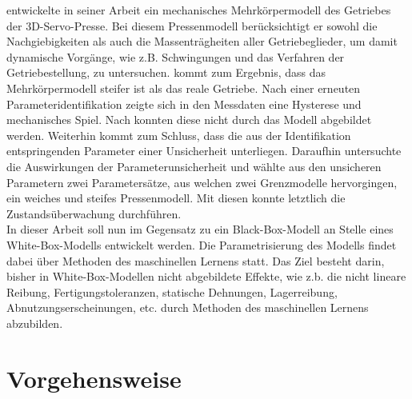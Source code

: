 \cite{Rakowitsch.2018} entwickelte in seiner Arbeit ein mechanisches Mehrkörpermodell des Getriebes der 3D-Servo-Presse. Bei diesem Pressenmodell berücksichtigt er sowohl die Nachgiebigkeiten als auch die Massenträgheiten aller Getriebeglieder, um damit dynamische Vorgänge, wie z.B. Schwingungen und das Verfahren der Getriebestellung, zu untersuchen. \cite{Rakowitsch.2018} kommt zum Ergebnis, dass das Mehrkörpermodell steifer ist als das reale Getriebe. Nach einer erneuten Parameteridentifikation zeigte sich in den Messdaten eine Hysterese und mechanisches Spiel. Nach \cite{Rakowitsch.2018} konnten diese nicht durch das Modell abgebildet werden. Weiterhin kommt \cite{Rakowitsch.2018} zum Schluss, dass die aus der Identifikation entspringenden Parameter einer Unsicherheit unterliegen. Daraufhin untersuchte \cite{Rakowitsch.2018} die Auswirkungen der Parameterunsicherheit und wählte aus den unsicheren Parametern zwei Parametersätze, aus welchen zwei Grenzmodelle hervorgingen, ein weiches und steifes Pressenmodell. Mit diesen konnte \cite{Rakowitsch.2018} letztlich die Zustandsüberwachung durchführen. \\

In dieser Arbeit soll nun im Gegensatz zu \cite{Rakowitsch.2018} ein Black-Box-Modell an Stelle eines White-Box-Modells entwickelt werden. Die Parametrisierung des Modells findet dabei über Methoden des maschinellen Lernens statt. Das Ziel besteht darin, bisher in White-Box-Modellen nicht abgebildete Effekte, wie z.b. die nicht lineare Reibung, Fertigungstoleranzen, statische Dehnungen, Lagerreibung, Abnutzungserscheinungen, etc. durch Methoden des maschinellen Lernens abzubilden.


\section{Vorgehensweise}








   




